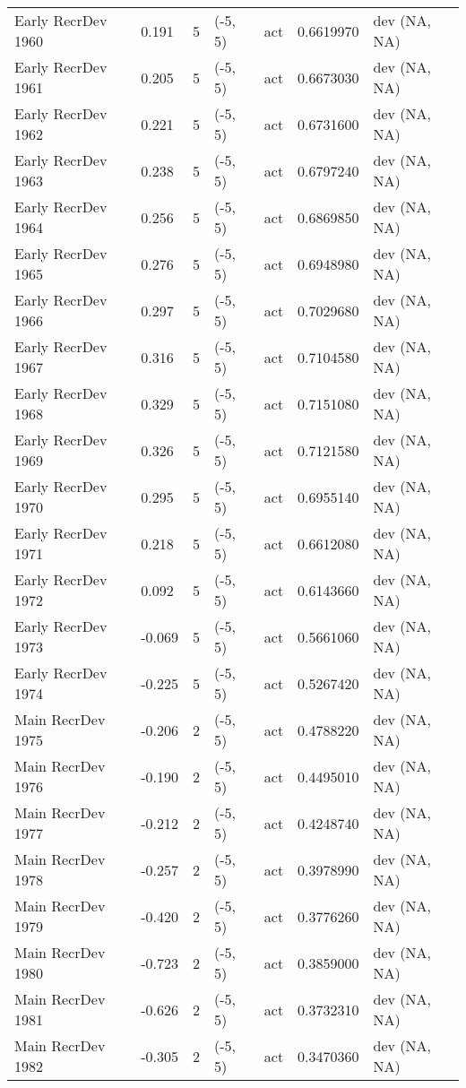 \documentclass[11pt,
  english,
  a4paper,
]{article}
\begin{document}
\begin{landscape}
\begin{longtable}[t]{>{\raggedright\arraybackslash}p{8.5cm}lllll>{\raggedright\arraybackslash}p{4cm}}
Early RecrDev 1960 & 0.191 & 5 & (-5, 5) & act & 0.6619970 & dev (NA, NA)\\
Early RecrDev 1961 & 0.205 & 5 & (-5, 5) & act & 0.6673030 & dev (NA, NA)\\
Early RecrDev 1962 & 0.221 & 5 & (-5, 5) & act & 0.6731600 & dev (NA, NA)\\
Early RecrDev 1963 & 0.238 & 5 & (-5, 5) & act & 0.6797240 & dev (NA, NA)\\
Early RecrDev 1964 & 0.256 & 5 & (-5, 5) & act & 0.6869850 & dev (NA, NA)\\
Early RecrDev 1965 & 0.276 & 5 & (-5, 5) & act & 0.6948980 & dev (NA, NA)\\
Early RecrDev 1966 & 0.297 & 5 & (-5, 5) & act & 0.7029680 & dev (NA, NA)\\
Early RecrDev 1967 & 0.316 & 5 & (-5, 5) & act & 0.7104580 & dev (NA, NA)\\
Early RecrDev 1968 & 0.329 & 5 & (-5, 5) & act & 0.7151080 & dev (NA, NA)\\
Early RecrDev 1969 & 0.326 & 5 & (-5, 5) & act & 0.7121580 & dev (NA, NA)\\
Early RecrDev 1970 & 0.295 & 5 & (-5, 5) & act & 0.6955140 & dev (NA, NA)\\
Early RecrDev 1971 & 0.218 & 5 & (-5, 5) & act & 0.6612080 & dev (NA, NA)\\
Early RecrDev 1972 & 0.092 & 5 & (-5, 5) & act & 0.6143660 & dev (NA, NA)\\
Early RecrDev 1973 & -0.069 & 5 & (-5, 5) & act & 0.5661060 & dev (NA, NA)\\
Early RecrDev 1974 & -0.225 & 5 & (-5, 5) & act & 0.5267420 & dev (NA, NA)\\
Main RecrDev 1975 & -0.206 & 2 & (-5, 5) & act & 0.4788220 & dev (NA, NA)\\
Main RecrDev 1976 & -0.190 & 2 & (-5, 5) & act & 0.4495010 & dev (NA, NA)\\
Main RecrDev 1977 & -0.212 & 2 & (-5, 5) & act & 0.4248740 & dev (NA, NA)\\
Main RecrDev 1978 & -0.257 & 2 & (-5, 5) & act & 0.3978990 & dev (NA, NA)\\
Main RecrDev 1979 & -0.420 & 2 & (-5, 5) & act & 0.3776260 & dev (NA, NA)\\
Main RecrDev 1980 & -0.723 & 2 & (-5, 5) & act & 0.3859000 & dev (NA, NA)\\
Main RecrDev 1981 & -0.626 & 2 & (-5, 5) & act & 0.3732310 & dev (NA, NA)\\
Main RecrDev 1982 & -0.305 & 2 & (-5, 5) & act & 0.3470360 & dev (NA, NA)\\

\end{longtable}
\end{landscape}
\end{document}
